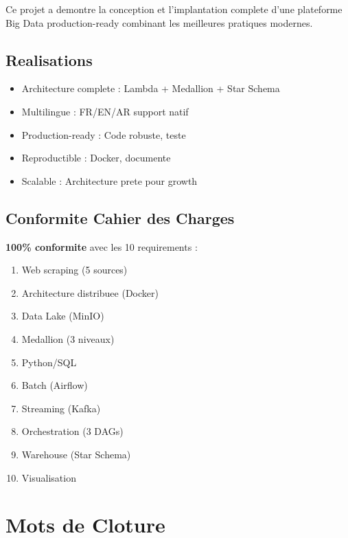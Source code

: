 \documentclass[12pt,a4paper]{report}
\newcommand{\checkmark}{\ding{51}}
\begin{document}
Ce projet a demontre la conception et l'implantation complete d'une plateforme Big Data production-ready combinant les meilleures pratiques modernes.

\subsection{Realisations}

\begin{itemize}
    \item[\checkmark] Architecture complete : Lambda + Medallion + Star Schema
    \item[\checkmark] Multilingue : FR/EN/AR support natif
    \item[\checkmark] Production-ready : Code robuste, teste
    \item[\checkmark] Reproductible : Docker, documente
    \item[\checkmark] Scalable : Architecture prete pour growth
\end{itemize}

\subsection{Conformite Cahier des Charges}

\textbf{100\% conformite} avec les 10 requirements :

\begin{enumerate}
    \item[\checkmark] Web scraping (5 sources)
    \item[\checkmark] Architecture distribuee (Docker)
    \item[\checkmark] Data Lake (MinIO)
    \item[\checkmark] Medallion (3 niveaux)
    \item[\checkmark] Python/SQL
    \item[\checkmark] Batch (Airflow)
    \item[\checkmark] Streaming (Kafka)
    \item[\checkmark] Orchestration (3 DAGs)
    \item[\checkmark] Warehouse (Star Schema)
    \item[\checkmark] Visualisation
\end{enumerate}

\section{Mots de Cloture}
\end{document}
